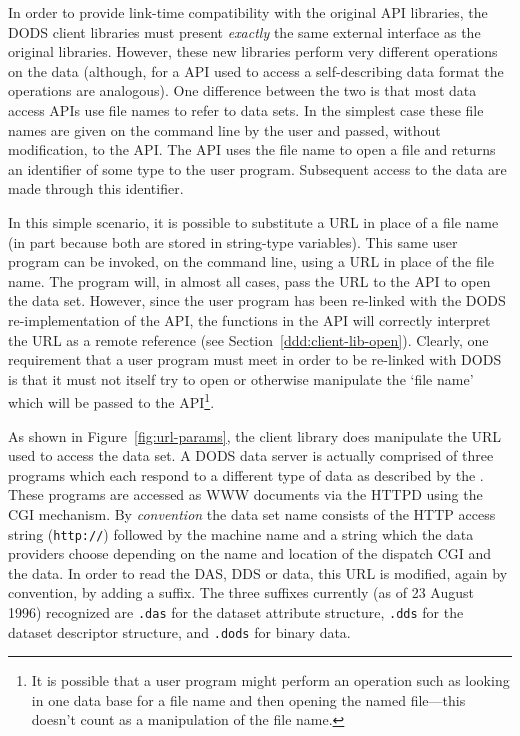 In order to provide link-time compatibility with the original API libraries,
the DODS client libraries must present {\em exactly\/} the same external
interface as the original libraries. However, these new libraries perform
very different operations on the data (although, for a API used to access a
self-describing data format the operations are analogous). One difference
between the two is that most data access APIs use file names to refer to data
sets. In the simplest case these file names are given on the command line by
the user and passed, without modification, to the API\@. The API uses the file
name to open a file and returns an identifier of some type to the user
program. Subsequent access to the data are made through this identifier.

In this simple scenario, it is possible to substitute a URL in place of a
file name (in part because both are stored in string-type variables). This
same user program can be invoked, on the command line, using a URL in place
of the file name. The program will, in almost all cases, pass the URL to the
API to open the data set. However, since the user program has been re-linked
with the DODS re-implementation of the API, the functions in the API will
correctly interpret the URL as a remote reference (see
Section~\ref{ddd:client-lib-open}). Clearly, one requirement that a user
program must meet in order to be re-linked with DODS is that it must not
itself try to open or otherwise manipulate the `file name' which will be
passed to the API\footnote{It is possible that a user program might perform
  an operation such as looking in one data base for a file name and then
  opening the named file---this doesn't count as a manipulation of the file
  name.}.

As shown in Figure~\ref{fig:url-params}, the client library does manipulate
the URL used to access the data set. A DODS data server is actually comprised
of three programs which each respond to a different type of data as described
by the \Dap. These programs are accessed as WWW documents via the HTTPD using
the CGI mechanism. By {\em convention\/} the data set name consists of the
HTTP access string ({\tt http://}) followed by the machine name and a string
which the data providers choose depending on the name and location of the
dispatch CGI and the data. In order to read the DAS, DDS or data, this URL is
modified, again by convention, by adding a suffix. The three suffixes
currently (as of 23 August 1996) %
recognized are {\tt .das} for the dataset attribute
structure, {\tt .dds} for the dataset descriptor structure, and {\tt .dods}
for binary data.

